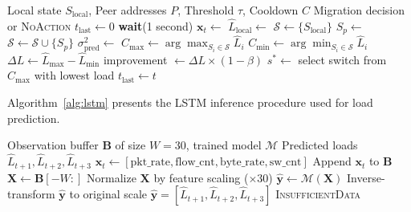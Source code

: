 \documentclass[12pt,a4paper]{report}
\begin{document}
\begin{algorithm}[H]
\caption{HYDRA-LB Proactive Optimization Loop}
\label{alg:optimizer}
\begin{algorithmic}[1]
\Require Local state $S_{\text{local}}$, Peer addresses $P$, Threshold $\tau$, Cooldown $C$
\Ensure Migration decision or \textsc{NoAction}
\State $t_{\text{last}} \gets 0$ 
    \State \textbf{wait}(1 second)
    \State $\mathbf{x}_t \gets$  
    \State $\hat{L}_{\text{local}} \gets$  
    \State $\mathcal{S} \gets \{S_{\text{local}}\}$
        \State $S_p \gets$  
        \State $\mathcal{S} \gets \mathcal{S} \cup \{S_p\}$
    \EndFor
    \State $\sigma^2_{\text{pred}} \gets$ 
        \State $C_{\max} \gets \arg\max_{S_i \in \mathcal{S}} \hat{L}_i$
        \State $C_{\min} \gets \arg\min_{S_i \in \mathcal{S}} \hat{L}_i$
        \State $\Delta L \gets \hat{L}_{\max} - \hat{L}_{\min}$
        \State improvement $\gets \Delta L \times (1 - \beta)$
            \State $s^* \gets$ select switch from $C_{\max}$ with lowest load
            \State {}
            \State $t_{\text{last}} \gets t$
        \EndIf
    \EndIf
\EndWhile
\end{algorithmic}
\end{algorithm}

Algorithm~\ref{alg:lstm} presents the LSTM inference procedure used for load prediction.

\begin{algorithm}[H]
\caption{LSTM Load Prediction Inference}
\label{alg:lstm}
\begin{algorithmic}[1]
\Require Observation buffer $\mathbf{B}$ of size $W = 30$, trained model $\mathcal{M}$
\Ensure Predicted loads $\hat{L}_{t+1}, \hat{L}_{t+2}, \hat{L}_{t+3}$
\State $\mathbf{x}_t \gets [\text{pkt\_rate}, \text{flow\_cnt}, \text{byte\_rate}, \text{sw\_cnt}]$
\State Append $\mathbf{x}_t$ to $\mathbf{B}$
    \State $\mathbf{X} \gets \mathbf{B}[-W:]$ 
    \State Normalize $\mathbf{X}$ by feature scaling ($\times 30$)
    \State $\hat{\mathbf{y}} \gets \mathcal{M}(\mathbf{X})$ 
    \State Inverse-transform $\hat{\mathbf{y}}$ to original scale
    \State \Return $\hat{\mathbf{y}} = [\hat{L}_{t+1}, \hat{L}_{t+2}, \hat{L}_{t+3}]$
\Else
    \State \Return \textsc{InsufficientData}
\EndIf
\end{algorithmic}
\end{algorithm}
\end{document}
